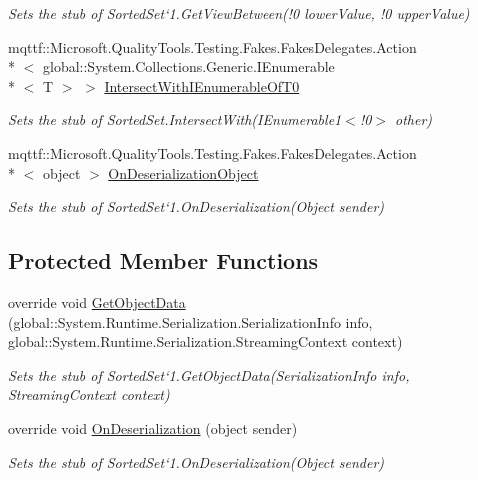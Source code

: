 \begin{DoxyCompactItemize}
\begin{DoxyCompactList}\small\item\em Sets the stub of Sorted\-Set`1.Get\-View\-Between(!0 lower\-Value, !0 upper\-Value)\end{DoxyCompactList}\item 
mqttf\-::\-Microsoft.\-Quality\-Tools.\-Testing.\-Fakes.\-Fakes\-Delegates.\-Action\\*
$<$ global\-::\-System.\-Collections.\-Generic.\-I\-Enumerable\\*
$<$ T $>$ $>$ \hyperlink{class_system_1_1_collections_1_1_generic_1_1_fakes_1_1_stub_sorted_set_3_01_t_01_4_a5df9427683e21eec4e192d16be5013a2}{Intersect\-With\-I\-Enumerable\-Of\-T0}
\begin{DoxyCompactList}\small\item\em Sets the stub of Sorted\-Set{.\-Intersect\-With(I\-Enumerable}1$<$!0$>$ other)\end{DoxyCompactList}\item 
mqttf\-::\-Microsoft.\-Quality\-Tools.\-Testing.\-Fakes.\-Fakes\-Delegates.\-Action\\*
$<$ object $>$ \hyperlink{class_system_1_1_collections_1_1_generic_1_1_fakes_1_1_stub_sorted_set_3_01_t_01_4_ae7a8ae2be822ebb9a150b60798ca637b}{On\-Deserialization\-Object}
\begin{DoxyCompactList}\small\item\em Sets the stub of Sorted\-Set`1.On\-Deserialization(\-Object sender)\end{DoxyCompactList}\end{DoxyCompactItemize}
\subsection*{Protected Member Functions}
\begin{DoxyCompactItemize}
\item 
override void \hyperlink{class_system_1_1_collections_1_1_generic_1_1_fakes_1_1_stub_sorted_set_3_01_t_01_4_a216d4ebf002905929f84dfe45253af3a}{Get\-Object\-Data} (global\-::\-System.\-Runtime.\-Serialization.\-Serialization\-Info info, global\-::\-System.\-Runtime.\-Serialization.\-Streaming\-Context context)
\begin{DoxyCompactList}\small\item\em Sets the stub of Sorted\-Set`1.Get\-Object\-Data(\-Serialization\-Info info, Streaming\-Context context)\end{DoxyCompactList}\item 
override void \hyperlink{class_system_1_1_collections_1_1_generic_1_1_fakes_1_1_stub_sorted_set_3_01_t_01_4_aa5d180185a7f4b530260fc6a763e0bf3}{On\-Deserialization} (object sender)
\begin{DoxyCompactList}\small\item\em Sets the stub of Sorted\-Set`1.On\-Deserialization(\-Object sender)\end{DoxyCompactList}\end{DoxyCompactItemize}
